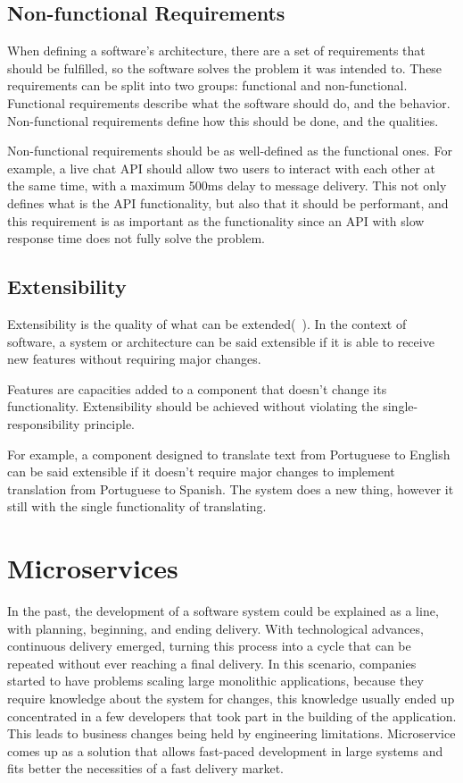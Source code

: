 \subsection*{Non-functional Requirements}
\label{sec:nonfunctional}
When defining a software's architecture, there are a set of requirements that should be fulfilled, so the software solves the problem it was intended to. These requirements can be split into two groups: functional and non-functional. Functional requirements describe what the software should do, and the behavior. Non-functional requirements define how this should be done, and the qualities.

Non-functional requirements should be as well-defined as the functional ones. For example, a live chat API should allow two users to interact with each other at the same time, with a maximum 500ms delay to message delivery. This not only defines what is the API functionality, but also that it should be performant, and this requirement is as important as the functionality since an API with slow response time does not fully solve the problem.

\subsection*{Extensibility}
\label{sec:extensibility}
Extensibility is the quality of what can be extended(~\cite{Evoluctionary}). In the context of software, a system or architecture can be said extensible if it is able to receive new features without requiring major changes. 

Features are capacities added to a component that doesn't change its functionality. Extensibility should be achieved without violating the single-responsibility principle.

For example, a component designed to translate text from Portuguese to English can be said extensible if it doesn't require major changes to implement translation from Portuguese to Spanish. The system does a new thing, however it still with the single functionality of translating.

\section{Microservices}
\label{sec:microservices}
In the past, the development of a software system could be explained as a line, with planning, beginning, and ending delivery. With technological advances, continuous delivery emerged, turning this process into a cycle that can be repeated without ever reaching a final delivery. In this scenario, companies started to have problems scaling large monolithic applications, because they require knowledge about the system for changes, this knowledge usually ended up concentrated in a few developers that took part in the building of the application. This leads to business changes being held by engineering limitations. Microservice comes up as a solution that allows fast-paced development in large systems and fits better the necessities of a fast delivery market. 

